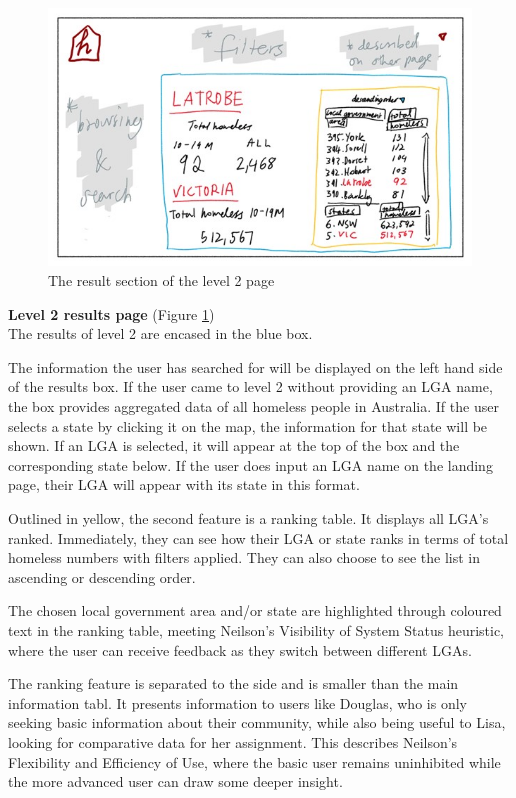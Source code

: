 \documentclass[12pt, a4paper]{article}
\begin{document}
\begin{figure}[h]
\centering
\includegraphics[scale=.9]{level2inner.jpg} 
\caption{The result section of the level 2 page}
\label{fig:2inner}
\end{figure}
\textbf{Level 2 results page} (Figure \ref{fig:2inner}) \\
The results of level 2 are encased in the blue box.

The information the user has searched for will be displayed on the left hand side of the results box. If the user came to level 2 without providing an LGA name, the box provides aggregated data of all homeless people in Australia. If the user selects a state by clicking it on the map, the information for that state will be shown. If an LGA is selected, it will appear at the top of the box and the corresponding state below. If the user does input an LGA name on the landing page, their LGA will appear with its state in this format.

Outlined in yellow, the second feature is a ranking table. It displays all LGA's ranked. Immediately, they can see how their LGA or state ranks in terms of total homeless numbers with filters applied. They can also choose to see the list in ascending or descending order.

The chosen local government area and/or state are highlighted through coloured text in the ranking table, meeting Neilson’s Visibility of System Status heuristic, where the user can receive feedback as they switch between different LGAs. 

The ranking feature is separated to the side and is smaller than the main information tabl. It presents information to users like Douglas, who is only seeking basic information about their community, while also being useful to Lisa, looking for comparative data for her assignment. This describes Neilson’s Flexibility and Efficiency of Use, where the basic user remains uninhibited while the more advanced user can draw some deeper insight.
\end{document}
